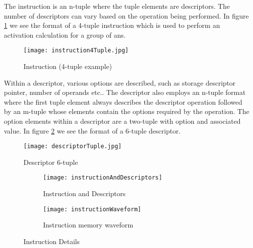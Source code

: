 The instruction is an n-tuple where the tuple elements are descriptors. The number of descriptors can vary based on the operation being performed. 
In figure \ref{fig:Instruction (4-tuple example)} we see the format of a 4-tuple instruction which is used to perform an activation calculation for a group of \acp{an}.

\begin{figure}[!t]
\centering
\captionsetup{justification=centering}
\captionsetup{width=.9\linewidth}
\centerline{
\mbox{\texttt{[image: instruction4Tuple.jpg]}}
}
\caption{Instruction (4-tuple example)}
\label{fig:Instruction (4-tuple example)}
\end{figure}

Within a descriptor, various options are described, such as storage descriptor pointer, number of operands etc..
The descriptor also employs an n-tuple format where the first tuple element always describes the descriptor operation followed by an m-tuple whose elements contain the options required by the operation.
The option elements within a descriptor are a two-tuple with option and associated value.
In figure \ref{fig:descriptorTuple} we see the format of a 6-tuple descriptor.

\begin{figure}[!t]
\centering
\captionsetup{justification=centering}
\captionsetup{width=.9\linewidth}
\centerline{
\mbox{\texttt{[image: descriptorTuple.jpg]}}
}
\caption{Descriptor 6-tuple}
\label{fig:descriptorTuple}
\end{figure}


\begin{figure}
\centering
  \begin{subfigure}{.95\textwidth}
    \centering
    \mbox{\texttt{[image: instructionAndDescriptors]}}
    \captionsetup{justification=centering, skip=10pt}
    \caption{Instruction and Descriptors}
    \label{fig:Instruction and Descriptors}
  \end{subfigure}%

\bigskip

  \vspace{-45pt}
  \begin{subfigure}{1\textwidth}
    \centering
    \vspace{40pt}
    \texttt{[image: instructionWaveform]}
    \captionsetup{justification=centering, skip=10pt}
    \caption{Instruction memory waveform}
    \label{fig:Instruction memory waveform}
  \end{subfigure}%
\vspace{-10pt}
\captionsetup{justification=centering, skip=16pt}
\caption{Instruction Details}
\label{fig:Instruction Details}
\end{figure}



